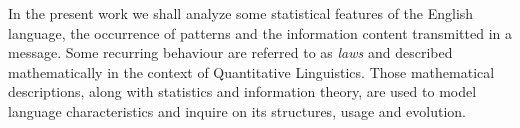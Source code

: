 In the present work we shall analyze some statistical features of the English language, the occurrence 
of patterns and the information content transmitted in a message. Some recurring behaviour are referred to as 
\emph{laws} and described mathematically in the context of Quantitative Linguistics.
Those mathematical descriptions, along with statistics and information theory, 
are used to model language characteristics and inquire on its structures, usage and evolution.



